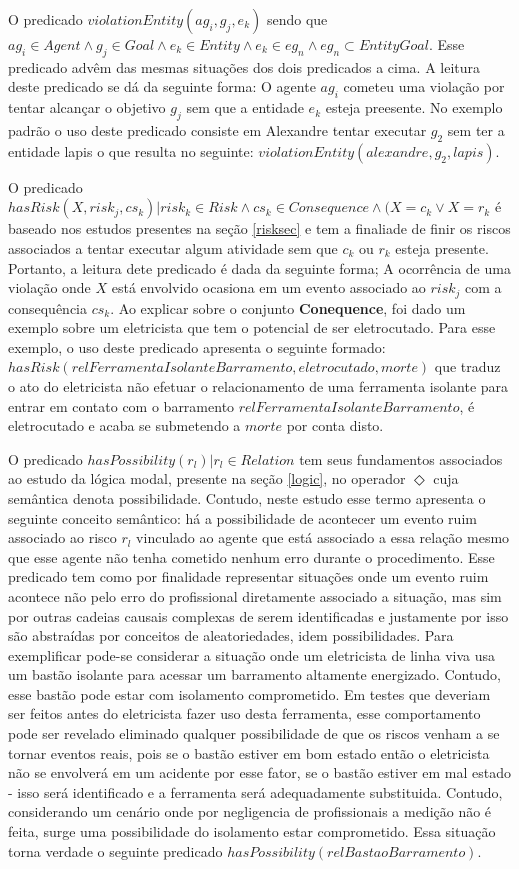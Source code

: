 O predicado $ violationEntity(ag_i,g_j,e_k) $ sendo que $ag_i \in Agent \wedge g_j \in Goal \wedge e_k \in Entity \wedge e_k \in eg_n \wedge eg_n \subset EntityGoal $.
Esse predicado advêm das mesmas situações dos dois predicados a cima. A leitura deste predicado se dá da seguinte forma: O agente 
$ag_i$ cometeu uma violação por tentar alcançar o objetivo $g_j$ sem que a entidade $e_k$ esteja preesente. No exemplo padrão o uso 
deste predicado consiste em Alexandre tentar executar $g_2$ sem ter a entidade lapis o que resulta no seguinte: $violationEntity(alexandre, g_2, lapis)$.

O predicado $ hasRisk(X, risk_j, cs_k) | risk_k \in Risk \wedge cs_k \in Consequence \wedge (X = c_k \vee X = r_k $ é baseado nos estudos 
presentes na seção \ref{risksec} e tem a finaliade de finir os riscos associados a tentar executar algum atividade sem que 
$c_k$ ou $r_k$ esteja presente. Portanto, a leitura dete predicado é dada da seguinte forma; A ocorrência de uma violação 
onde $X$ está envolvido ocasiona em um evento associado ao $risk_j$ com a consequência $cs_k$. Ao explicar sobre o conjunto 
\textbf{Conequence}, foi dado um exemplo sobre um eletricista que tem o potencial de ser eletrocutado. Para esse exemplo, 
o uso deste predicado apresenta o seguinte formado: $hasRisk(relFerramentaIsolanteBarramento, eletrocutado, morte)$ que traduz
o ato do eletricista não efetuar o relacionamento de uma ferramenta isolante para entrar em contato com o barramento $relFerramentaIsolanteBarramento$,
é eletrocutado e acaba se submetendo a $morte$ por conta disto.

O predicado $hasPossibility(r_l) | r_l \in Relation $ tem seus fundamentos associados ao estudo da lógica modal, presente na seção \ref{logic}, no operador 
$\Diamond$ cuja semântica denota possibilidade. Contudo, neste estudo esse termo apresenta o seguinte conceito semântico: há a possibilidade 
de acontecer um evento ruim associado ao risco $r_l$ vinculado ao agente que está associado a essa relação mesmo que esse agente 
não tenha cometido nenhum erro durante o procedimento. Esse predicado tem como por finalidade representar situações onde um evento 
ruim acontece não pelo erro do profissional diretamente associado a situação, mas sim por outras cadeias causais complexas de serem identificadas e justamente por isso 
são abstraídas por conceitos de aleatoriedades, idem possibilidades. Para 
exemplificar pode-se considerar a situação onde um eletricista de linha viva usa um bastão isolante para acessar um barramento altamente energizado.
Contudo, esse bastão pode estar com isolamento comprometido. Em testes que deveriam ser feitos antes do eletricista fazer uso desta ferramenta,
esse comportamento pode ser revelado eliminado qualquer possibilidade de que os riscos venham a se tornar eventos reais, pois se o bastão estiver em bom estado
então o eletricista não se envolverá em um acidente por esse fator, se o bastão estiver em mal estado - isso será identificado e a ferramenta 
será adequadamente substituida. Contudo, considerando um cenário onde por negligencia de profissionais a medição não é feita, surge 
uma possibilidade do isolamento estar comprometido. Essa situação torna verdade o seguinte predicado $hasPossibility(relBastaoBarramento)$.

